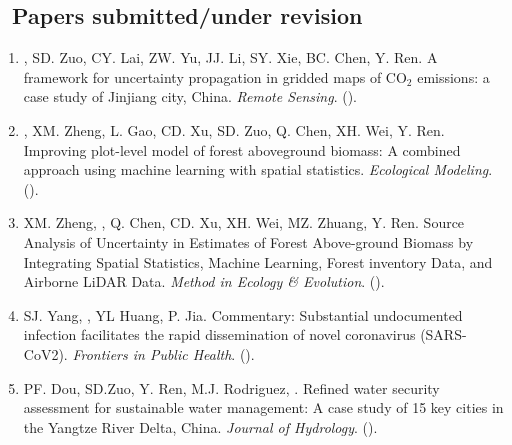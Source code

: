 \subsection*{\texorpdfstring{\faBook\ Papers submitted/under revision}{Papers submitted/under revision}}
\begin{enumerate}
\item
    \Shaoqing, SD. Zuo, CY. Lai, ZW. Yu, JJ. Li, SY. Xie, BC. Chen, Y. Ren.
    A framework for uncertainty propagation in gridded maps of CO$_2$ emissions: a case study of Jinjiang city, China.  
   \textit{Remote Sensing}.
    (\Revision).
\item
    \Shaoqing\CF, XM. Zheng, L. Gao, CD. Xu, SD. Zuo, Q. Chen, XH. Wei, Y. Ren.
    Improving plot-level model of forest aboveground biomass: A combined approach using machine learning with spatial statistics.
    \textit{Ecological Modeling}. 
    (\Review).
\item
    XM. Zheng, \Shaoqing, Q. Chen, CD. Xu, XH. Wei, MZ. Zhuang, Y. Ren.
    Source Analysis of Uncertainty in Estimates of Forest Above-ground Biomass by Integrating Spatial Statistics, Machine Learning, Forest inventory Data, and Airborne LiDAR Data.
    \textit{Method in Ecology \& Evolution}. 
    (\Submitted).
\item
    SJ. Yang, \Shaoqing, YL Huang, P. Jia.
    Commentary: Substantial undocumented infection facilitates the rapid dissemination of novel coronavirus (SARS-CoV2).
    \textit{Frontiers in Public Health}. 
    (\Review).
\item
    PF. Dou, SD.Zuo, Y. Ren, M.J. Rodriguez, \Shaoqing.
    Refined water security assessment for sustainable water management: A case study of 15 key cities in the Yangtze River Delta, China.
    \textit{Journal of Hydrology}.
    (\Revision).
\end{enumerate}